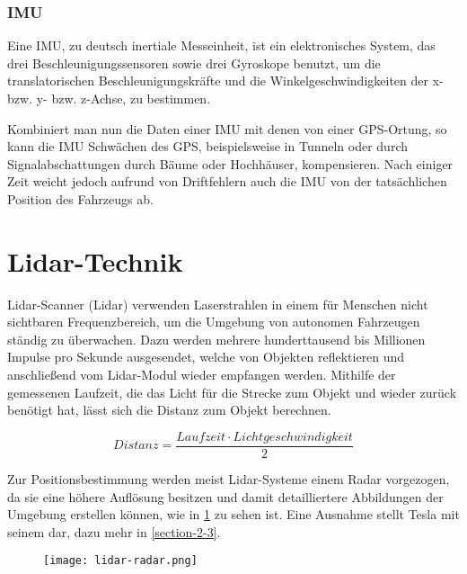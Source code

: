 \subsubsection{\acl{IMU}}

Eine \ac{IMU}, zu deutsch inertiale Messeinheit, ist ein elektronisches System, das drei Beschleunigungssensoren sowie drei Gyroskope benutzt, um die translatorischen Beschleunigungskräfte und die Winkelgeschwindigkeiten der x- bzw. y- bzw. z-Achse, zu bestimmen. 

Kombiniert man nun die Daten einer \ac{IMU} mit denen von einer \ac{GPS}-Ortung, so kann die \ac{IMU} Schwächen des \ac{GPS}, beispielsweise in Tunneln oder durch Signalabschattungen durch Bäume oder Hochhäuser, kompensieren. Nach einiger Zeit weicht jedoch aufrund von Driftfehlern auch die \ac{IMU} von der tatsächlichen Position des Fahrzeugs ab. 


\section{Lidar-Technik}

\acs{Lidar}-Scanner (\acl{Lidar}) verwenden Laserstrahlen in einem für Menschen nicht sichtbaren Frequenzbereich, um die Umgebung von autonomen Fahrzeugen ständig zu überwachen. Dazu werden mehrere hunderttausend bis Millionen Impulse pro Sekunde ausgesendet, welche von Objekten reflektieren und anschließend vom \acs{Lidar}-Modul wieder empfangen werden.  Mithilfe der gemessenen Laufzeit, die das Licht für die Strecke zum Objekt und wieder zurück benötigt hat, lässt sich die Distanz zum Objekt berechnen.

\begin{equation}
  Distanz = \frac{Laufzeit \cdot Lichtgeschwindigkeit}{2}
\end{equation}
\vspace{0.3cm}

Zur Positionsbestimmung werden meist \acs{Lidar}-Systeme einem \acs{Radar} vorgezogen, da sie eine höhere Auflösung besitzen und damit detailliertere Abbildungen der Umgebung erstellen können, wie in \ref{lidar-radar} zu sehen ist. Eine Ausnahme stellt Tesla mit seinem  dar, dazu mehr in \ref{section-2-3}.

\begin{figure}\centering
  \texttt{[image: lidar-radar.png]}
  \label{lidar-radar}
\end{figure}

